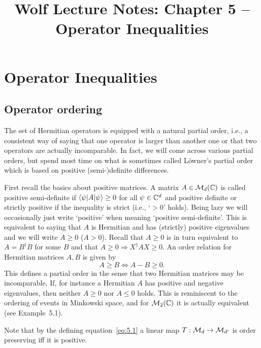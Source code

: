 \documentclass[11pt,a4paper]{article}
\title{Wolf Lecture Notes: Chapter 5 -- Operator Inequalities}
\author{}
\date{}
\theoremstyle{plain}
\theoremstyle{definition}
\theoremstyle{remark}
\numberwithin{equation}{section}
\begin{document}
\maketitle
\tableofcontents

\setcounter{section}{4}
\section{Operator Inequalities}

\setcounter{problem}{9}

\subsection{Operator ordering}

The set of Hermitian operators is equipped with a natural partial order, i.e., a
consistent way of saying that one operator is larger than another one or that two
operators are actually incomparable. In fact, we will come across various partial
orders, but spend most time on what is sometimes called L\"owner's partial order
which is based on positive (semi-)definite differences.

First recall the basics about positive matrices. A matrix $A \in \mathcal{M}_d(\mathbb{C})$ is
called positive semi-definite if $\langle\psi|A|\psi\rangle \ge 0$ for all $\psi \in \mathbb{C}^d$
and positive definite or strictly positive if the inequality is strict (i.e., `$>0$'
holds). Being lazy we will occasionally just write `positive' when meaning
`positive semi-definite'. This is equivalent to saying that $A$ is Hermitian and has
(strictly) positive eigenvalues and we will write $A \ge 0$ ($A>0$). Recall that
$A\ge 0$ is in turn equivalent to $A=B^\dagger B$ for some $B$ and that
$A\ge 0 \Rightarrow X^\dagger A X \ge 0$.
An order relation for Hermitian matrices $A,B$ is given by
\begin{equation}\label{eq:5.1}
    A \ge B \iff A-B \ge 0.
\end{equation}
This defines a partial order in the sense that two Hermitian matrices may be
incomparable. If, for instance a Hermitian $A$ has positive and negative eigenvalues,
then neither $A\ge 0$ nor $A\le 0$ holds. This is reminiscent to the ordering of
events in Minkowski space, and for $\mathcal{M}_2(\mathbb{C})$ it is actually equivalent (see
Example~5.1).

Note that by the defining equation~\eqref{eq:5.1} a linear map
$T:\mathcal{M}_d \to \mathcal{M}_{d'}$ is order preserving iff it is positive.
\end{document}
